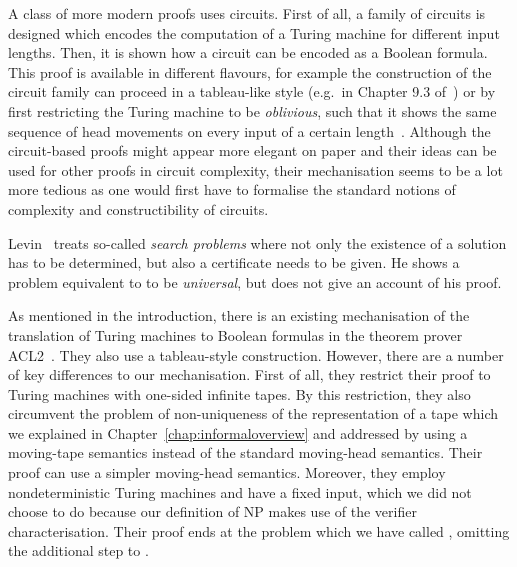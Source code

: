 A class of more modern proofs uses circuits. First of all, a family of circuits is designed which encodes the computation of a Turing machine for different input lengths. Then, it is shown how a circuit can be encoded as a Boolean formula. This proof is available in different flavours, for example the construction of the circuit family can proceed in a tableau-like style (e.g.\ in Chapter 9.3 of~\cite{Sipser:TheoryofComputation}) or by first restricting the Turing machine to be \textit{oblivious}, such that it shows the same sequence of head movements on every input of a certain length~\cite[p.~199ff]{Bläser:TISkript}.
Although the circuit-based proofs might appear more elegant on paper and their ideas can be used for other proofs in circuit complexity, their mechanisation seems to be a lot more tedious as one would first have to formalise the standard notions of complexity and constructibility of circuits.

Levin~\cite{levin_theorem} treats so-called \textit{search problems} where not only the existence of a solution has to be determined, but also a certificate needs to be given. He shows a problem equivalent to \SAT{} to be \textit{universal}, but does not give an account of his proof.

As mentioned in the introduction, there is an existing mechanisation of the translation of Turing machines to Boolean formulas in the theorem prover ACL2~\cite{gamboa:cook}. They also use a tableau-style construction. However, there are a number of key differences to our mechanisation.
First of all, they restrict their proof to Turing machines with one-sided infinite tapes. By this restriction, they also circumvent the problem of non-uniqueness of the representation of a tape which we explained in Chapter~\ref{chap:informaloverview} and addressed by using a moving-tape semantics instead of the standard moving-head semantics. Their proof can use a simpler moving-head semantics.
Moreover, they employ nondeterministic Turing machines and have a fixed input, which we did not choose to do because our definition of NP makes use of the verifier characterisation. Their proof ends at the problem which we have called \fsat{}, omitting the additional step to \sat{}.

